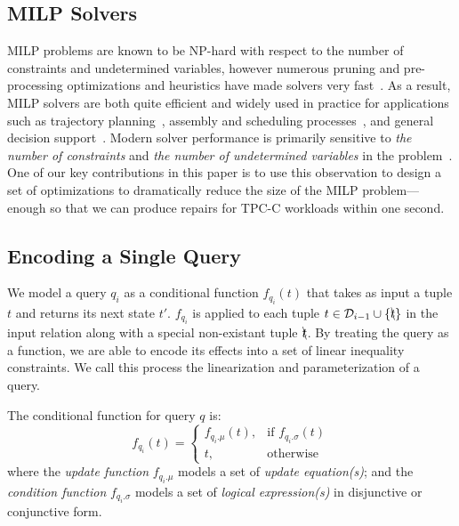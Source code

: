 \subsection{MILP Solvers}
\label{sec:MILP}

MILP problems are known to be NP-hard with respect to the number of constraints and undetermined variables, however numerous pruning and pre-processing optimizations and heuristics have made solvers very fast~\cite{quesada1992lp,stubbs1999branch,savelsbergh1994preprocessing,danna2005exploring,rothberg2007evolutionary,achterberg2009scip}.  
As a result, MILP solvers are both quite efficient and widely used in practice for applications such as trajectory planning~\cite{Ma2006, Richards02_JGCD, Kuwata2005a}, assembly and scheduling processes~\cite{Floudas2005, Sawik2011, Sawik2000}, and general decision support~\cite{Sabater2009, Milan2013}.
Modern solver performance is primarily sensitive to \textit{the number of constraints} and \textit{the number of undetermined variables} in the problem~\cite{atamturk2005integer,meindl2012analysis,gearhart2013comparison}. 
One of our key contributions in this paper is to use this observation to design a set of optimizations to dramatically reduce the size of the MILP problem---enough so that we can produce repairs for TPC-C workloads within one second.


\subsection{Encoding a Single Query}
\label{sec:linearize}

  We model a query $q_i$ as a conditional function $f_{q_i}(t)$ that takes as input a tuple $t$
  and returns its next state $t'$.  $f_{q_i}$ is applied to each 
  tuple $t \in \mathcal{D}_{i-1} \cup \{\bcancel{t}\}$ in the input relation along with a special
  non-existant tuple $\bcancel{t}$. 
  By treating the query as a function, we are able to encode its effects into a set
  of linear inequality constraints.  We call this process the linearization and 
  parameterization of a query.

  \begin{definition} 
  \label{def:cond}
    The conditional function for query $q$ is:
    \[
      f_{q_i}(t)= 
      \begin{cases}
      f_{q_i.\mu} (t) ,& \text{if } f_{q_i.\sigma} (t)\\
      t,              & \text{otherwise}
      \end{cases}
  \]
  where the \textit{update function} $f_{q_i.\mu}$ models a set of \textit{update equation(s)};
  and the \textit{condition function} $f_{q_i.\sigma}$ models a set of \textit{logical expression(s)} in 
  disjunctive or conjunctive form.
  \end{definition} 



